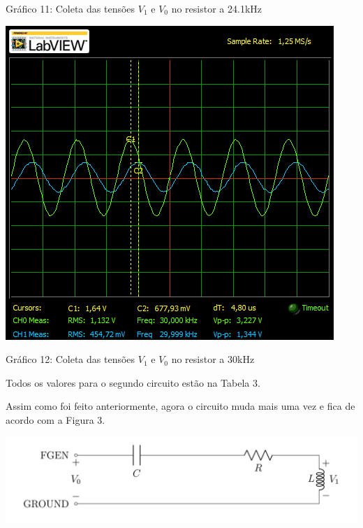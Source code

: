 \documentclass[a4 paper]{article}
\begin{document}
\begin{center}
Gráfico 11: Coleta das tensões $V_1$ e $V_0$ no resistor a 24.1kHz
\end{center}

\begin{table}[h]
\centering
\includegraphics[scale=0.7]{graficos/circ2/rgadicoa2-2-30}
\end{table}

\begin{center}
Gráfico 12: Coleta das tensões $V_1$ e $V_0$ no resistor a 30kHz
\end{center}

Todos os valores para o segundo circuito estão na Tabela 3.

\newpage


Assim como foi feito anteriormente, agora o circuito muda mais uma vez e fica de acordo com a Figura 3.

\begin{table}[h]
\centering
\includegraphics[scale=0.5]{figuras/circuito3}
\end{table}
\end{document}

